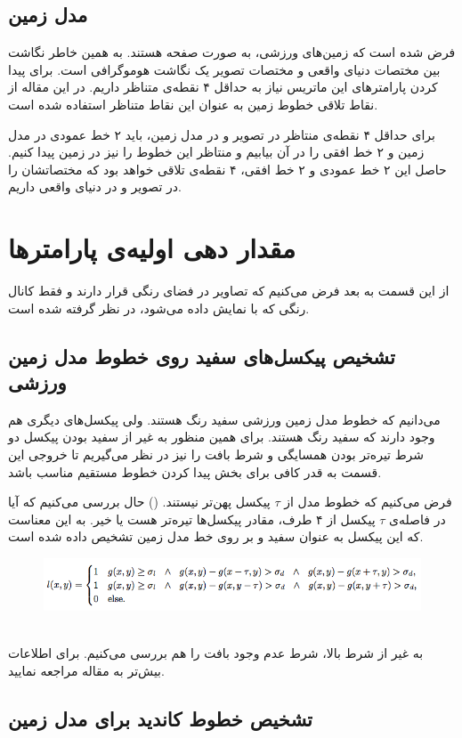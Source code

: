 \documentclass{report}
\begin{document}
\subsection{مدل زمین}
فرض شده است که زمین‌های ورزشی، به صورت صفحه هستند. به همین خاطر نگاشت بین مختصات دنیای واقعی و مختصات تصویر یک نگاشت هوموگرافی است. برای پیدا کردن پارامترهای این ماتریس نیاز به حداقل ۴ نقطه‌ی متناظر داریم. در این مقاله از نقاط تلاقی خطوط زمین به عنوان این نقاط متناظر استفاده شده است.

برای حداقل ۴ نقطه‌ی منتاظر در تصویر و در مدل زمین، باید ۲ خط عمودی در مدل زمین و ۲ خط افقی را در آن بیابیم و منتاظر این خطوط را نیز در زمین پیدا کنیم. حاصل این ۲ خط عمودی و ۲ خط افقی، ۴ نقطه‌ی تلاقی خواهد بود که مختصاتشان را در تصویر و در دنیای واقعی داریم.
\section{مقدار دهی اولیه‌ی پارامترها}
از این قسمت به بعد فرض می‌کنیم که تصاویر در فضای رنگی  قرار دارند و فقط کانال رنگی  که با \textit{} نمایش داده می‌شود، در نظر گرفته شده است.
\subsection{تشخیص پیکسل‌های سفید روی خطوط مدل زمین ورزشی}
می‌دانیم که خطوط مدل زمین ورزشی سفید رنگ هستند. ولی پیکسل‌های دیگری هم وجود دارند که سفید رنگ هستند. برای همین منظور به غیر از سفید بودن پیکسل دو شرط تیره‌تر بودن همسایگی و شرط بافت را نیز در نظر می‌گیریم تا خروجی این قسمت به قدر کافی برای بخش پیدا کردن خطوط مستقیم مناسب باشد.

فرض می‌کنیم که خطوط مدل از $\tau$ پیکسل پهن‌تر نیستند. (\textit{}) حال بررسی می‌کنیم که آیا در فاصله‌ی $\tau$ پیکسل از ۴ طرف، مقادر پیکسل‌ها تیره‌تر هست یا خیر. \textit{} به این معناست که این پیکسل به عنوان سفید و بر روی خط مدل زمین تشخیص داده شده است.
\begin{figure}
\centering
\includegraphics[scale=0.6]{wpixle.png}
\label{wpixle}
\end{figure}
\\

به غیر از شرط بالا، شرط عدم وجود بافت را هم بررسی می‌کنیم. برای اطلاعات بیش‌تر به مقاله مراجعه نمایید.
\subsection{تشخیص خطوط کاندید برای مدل زمین}

\begin{latin}
{}

\end{latin}
\end{document}
